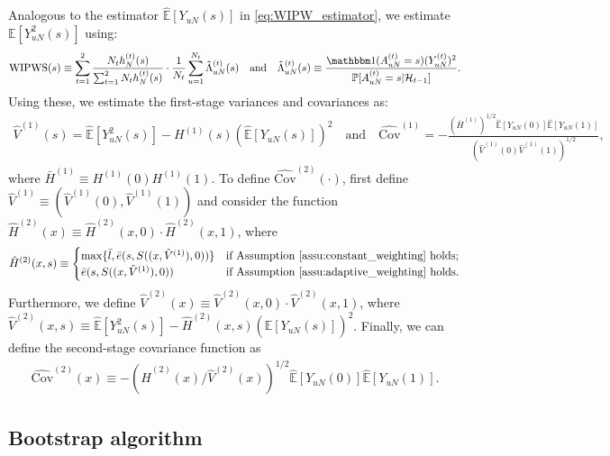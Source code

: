 \documentclass[12pt]{article}
\def\P{\mathbb{P}}
\def\P{\mathbb{P}}
\newcommand{\E}{\mathbb E}								%
\renewcommand{\P}{\mathbb{P}}							%
\newcommand{\indicator}{\mathbbm 1}						%
\newcommand{\WIPWS}{\mathrm{WIPWS}}
\begin{document}
Analogous to the estimator $\hat{\E}[Y_{uN}(s)]$ in \eqref{eq:WIPW_estimator}, we estimate $\E[Y_{uN}^2(s)]$ using:
\small
\begin{align}\label{eq:WIPWS_estimator}
	\WIPWS(s) \equiv \sum_{t=1}^2 \frac{N_th_{N}^{(t)}(s)}{\sum_{t=1}^2 N_t h_{N}^{(t)}(s)} \cdot \frac{1}{N_t} \sum_{u=1}^{N_t} \tilde{\Lambda}_{uN}^{(t)}(s)\quad \text{and}\quad
	\tilde{\Lambda}_{uN}^{(t)}(s) \equiv \frac{\indicator(A_{uN}^{(t)}=s)(Y_{uN}^{(t)})^2}{\P[A_{uN}^{(t)}=s|\mathcal{H}_{t-1}]}.
\end{align}
\normalsize
Using these, we estimate the first-stage variances and covariances as:
\small
\begin{align*}
	\hat{V}^{(1)}(s) = \hat{\E}[Y_{uN}^2(s)] - H^{(1)}(s)(\hat{\E}[Y_{uN}(s)])^2
	\quad \text{and}\quad
	\hat{\mathrm{Cov}}^{(1)} = -\frac{(\bar{H}^{(1)})^{1/2} \hat{\E}[Y_{uN}(0)] \hat{\E}[Y_{uN}(1)]}{(\hat{V}^{(1)}(0) \hat{V}^{(1)}(1))^{1/2}},
\end{align*}
\normalsize
where $\bar{H}^{(1)} \equiv H^{(1)}(0)H^{(1)}(1)$. To define $\hat{\mathrm{Cov}}^{(2)}(\cdot)$, first define $\hat V^{(1)}\equiv (\hat V^{(1)}(0),\hat V^{(1)}(1))$ and consider the function $\hat{H}^{(2)}(x) \equiv \hat{H}^{(2)}(x,0) \cdot \hat{H}^{(2)}(x,1)$, where
\begin{align*}
	\hat{H}^{(2)}(x, s) \equiv  
	\begin{cases}
        \max\{\bar{l}, \bar{e}(s, S((x, \hat{V}^{(1)}), 0))\} & \text{if Assumption \ref{assu:constant_weighting} holds}; \\
        \bar{e}(s, S((x, \hat{V}^{(1)}), 0)) & \text{if Assumption \ref{assu:adaptive_weighting} holds}. 
    \end{cases}
\end{align*}
Furthermore, we define $\hat{V}^{(2)}(x) \equiv \hat{V}^{(2)}(x, 0)\cdot \hat{V}^{(2)}(x, 1)$, where $\hat{V}^{(2)}(x,s) \equiv \hat{\mathbb{E}}[Y_{uN}^2(s)] - \hat{H}^{(2)}(x, s) (\hat{\mathbb{E}}[Y_{uN}(s)])^2$. Finally, we can define the second-stage covariance function as
\begin{align*}
	\hat{\mathrm{Cov}}^{(2)}(x) \equiv -(\hat{H}^{(2)}(x)/\hat{V}^{(2)}(x))^{1/2} \hat{\mathbb{E}}[Y_{uN}(0)] \hat{\mathbb{E}}[Y_{uN}(1)].
\end{align*}

\subsection{Bootstrap algorithm}\label{sec:bootstrap_algorithm_detail}
\end{document}
